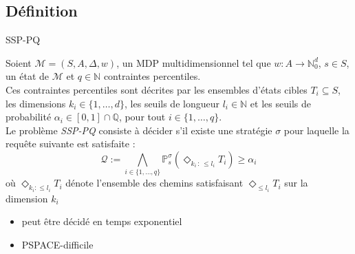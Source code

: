 \documentclass[compress]{beamer}
\theoremstyle{theorem}%
\begin{document}
\subsection{Définition}
\begin{frame}{SSP-PQ}
  \footnotesize
  \begin{definition}[SSP-PQ]
    Soient {\color{fibeamer@orange}$\mathcal{M} = (S, A, \Delta, w)$}, un MDP multidimensionnel tel que
    {\color{fibeamer@orange}$w: A \rightarrow \mathbb{N}_0^d$}, {\color{fibeamer@orange}$s \in S$}, un état de $\mathcal{M}$ et {\color{fibeamer@orange}$q \in \mathbb{N}$
    contraintes percentiles}. \\
    Ces contraintes percentiles sont décrites par les ensembles d'états cibles
    {\color{fibeamer@orange}$T_i \subseteq S$}, les {\color{fibeamer@orange}dimensions $k_i \in \{1, \dots, d\}$}, les seuils
    de longueur {\color{fibeamer@orange}$l_i \in \mathbb{N}$} et les seuils de probabilité {\color{fibeamer@orange}$\alpha_i \in
    [0, 1] \cap \mathbb{Q}$}, pour tout $i \in \{1, \dots, q\}$. \\
    Le problème \textit{\color{fibeamer@orange}SSP-PQ} consiste à décider s'il existe une stratégie {\color{fibeamer@orange}$\sigma$} pour laquelle la requête suivante est satisfaite : {\color{fibeamer@orange}
    \[
      \mathcal{Q} := \bigwedge_{i \in \{1, \dots, q\}} \mathbb{P}_s^\sigma(\Diamond_{k_i\, : \, \leq l_i} T_i) \geq \alpha_i
    \]}
    où $\Diamond_{k_i:\leq l_i}T_i$ dénote l'ensemble des chemins satisfaisant $\Diamond_{\leq l_i} T_i$ sur la dimension $k_i$
  \end{definition}
  \begin{itemize}
    \item peut être décidé en \alert{temps exponentiel}
    \item \alert{PSPACE-difficile}
  \end{itemize}
\end{frame}
\end{document}
